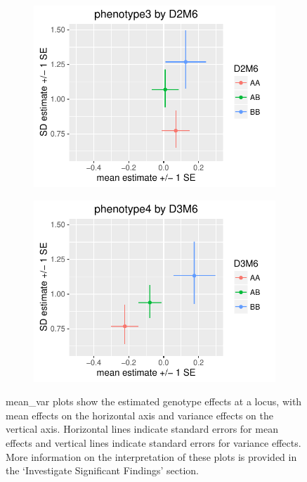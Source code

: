 \documentclass[9pt,twocolumn,twoside]{gsag3jnl}
\begin{document}
\begin{figure}
    \begin{subfigure}[t]{0.24\textwidth}
        \includegraphics[width=\textwidth]{images/mean_var_plot_phen3.pdf}
    \end{subfigure}  
    \hfill
    \begin{subfigure}[t]{0.24\textwidth}
        \includegraphics[width=\textwidth]{images/mean_var_plot_phen4.pdf}
    \end{subfigure}
    
    \caption{mean\_var plots show the estimated genotype effects at a locus, with mean effects on the horizontal axis and variance effects on the vertical axis.  Horizontal lines indicate standard errors for mean effects and vertical lines indicate standard errors for variance effects.  More information on the interpretation of these plots is provided in the `Investigate Significant Findings' section. \label{fig:mean_var_plots}}
\end{figure}
\end{document}
